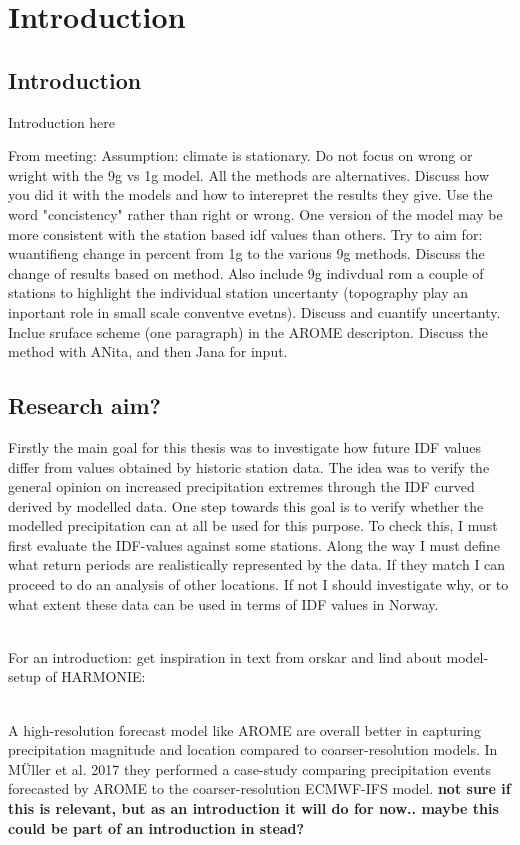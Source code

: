 \section{Introduction}
\label{sec:introduction}
\subsection{Introduction}
Introduction here 

From meeting:
Assumption: climate is stationary.
Do not focus on wrong or wright with the 9g vs 1g model. All the methods are alternatives. Discuss how you did it with the models and how to interepret the results they give. Use the word "concistency" rather than right or wrong. One version of the model may be more consistent with the station based idf values than others.
Try to aim for: wuantifieng change in percent from 1g to the various 9g methods. Discuss the change of results based on method.
Also include 9g indivdual rom a couple of stations to highlight the individual station uncertanty (topography play an inportant role in small scale conventve evetns). Discuss and cuantify uncertanty. 
Inclue sruface scheme (one paragraph) in the AROME descripton.
Discuss the method with ANita, and then Jana for input. 

\subsection{Research aim?}
Firstly the main goal for this thesis was to investigate how future IDF values differ from values obtained by historic station data. The idea was to verify the general opinion on increased precipitation extremes through the IDF curved derived by modelled data. One step towards this goal is to verify whether the modelled precipitation can at all be used for this purpose. To check this, I must first evaluate the IDF-values against some stations. Along the way I must define what return periods are realistically represented by the data. If they match I can proceed to do an analysis of other locations. If not I should investigate why, or to what extent these data can be used in terms of IDF values in Norway.

\\
For an introduction: get inspiration in text from orskar and lind about model-setup of HARMONIE: \cite{lind_arome} 

\\
A high-resolution forecast model like AROME are overall better in capturing precipitation magnitude and location compared to coarser-resolution models. In MÜller et al. 2017 \cite{muller} they performed a case-study comparing precipitation events forecasted by AROME to the coarser-resolution ECMWF-IFS model. \textbf{not sure if this is relevant, but as an introduction it will do for now.. maybe this could be part of an introduction in stead?}  